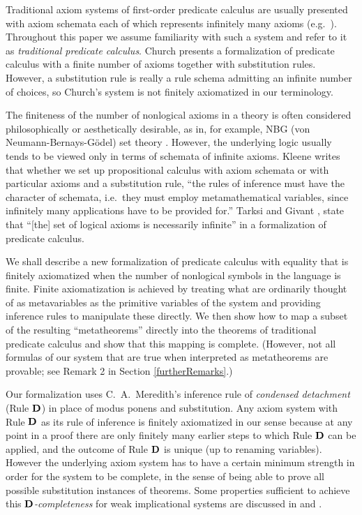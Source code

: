 \documentclass[leqno]{article}
\begin{document}
     Traditional axiom systems of first-order predicate calculus are usually
presented with axiom schemata each of which represents infinitely many axioms
(e.g.\ \cite[p.\ 73]{Hamilton}).  Throughout this paper we assume
familiarity with such a  system and refer to it as {\em traditional predicate
calculus}. Church \cite[pp.\ 218--219]{Church} presents a formalization of
predicate calculus with a finite number of axioms together with substitution
rules. However, a substitution rule is really a rule schema admitting an
infinite number of choices, so Church's system is not finitely axiomatized in
our terminology.

     The finiteness of the number of nonlogical axioms in a theory is often
considered philosophically or aesthetically desirable, as in, for example, NBG
(von Neumann-Bernays-G\"{o}del) set theory \cite[pp.\ 173--219]{Mendelson}.
However, the underlying logic usually tends to be viewed only in terms of
schemata of infinite axioms.  Kleene \cite[p.\ 140]{Kleene} writes that
whether we set up propositional calculus with axiom schemata or with
particular axioms and a substitution rule, ``the rules  of inference must have
the character of schemata, i.e.\ they must employ  metamathematical variables,
since infinitely many applications have to be  provided for.''  Tarksi and
Givant \cite[p.\ 7]{TarskiG}, state that ``[the] set of logical axioms is
necessarily infinite'' in a formalization of predicate calculus.

     We shall describe a new formalization of predicate calculus with equality
that is finitely axiomatized when the number of nonlogical symbols in the
language is finite.  Finite axiomatization is achieved by treating what are
ordinarily thought of as metavariables as the primitive variables of the
system and providing inference rules to manipulate these directly.  We then
show how to map a subset of the resulting ``metatheorems'' directly into the
theorems of traditional predicate calculus and show that this mapping is
complete.  (However, not all formulas of our system that are true when
interpreted as metatheorems are provable; see Remark 2 in Section
\ref{furtherRemarks}.)

     Our formalization uses C.~A.~Meredith's inference rule of {\em condensed
detachment} (Rule ${\bf D}$) \cite{Meredith} in place of modus ponens and
substitution.  Any axiom system with Rule ${\bf D}$ as its rule of inference
is finitely axiomatized in our sense because at any point in a proof
there are only finitely many earlier steps to which Rule ${\bf D}$ can be
applied, and the outcome of Rule ${\bf D}$ is unique (up to renaming
variables).  However the underlying axiom system has to have a certain minimum
strength in order for the system to be complete, in the sense of being able to
prove all possible substitution instances of theorems.  Some properties
sufficient to achieve this {\em ${\bf D}$-completeness} for weak implicational
systems are discussed in \cite{Hindley} and \cite{Megill}.
\end{document}
